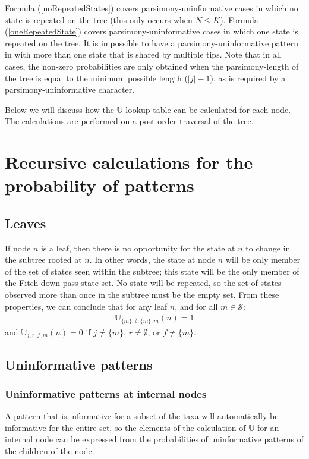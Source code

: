 \documentclass[11pt]{article}
\newcommand{\numStates}{\ensuremath{K}\xspace}
\newcommand{\numLeavesTotal}{\ensuremath{N}\xspace}
\newcommand{\allStates}{\ensuremath{\mathcal S}\xspace}
\newcommand{\probUninformPatClassSym}{\ensuremath{\mathbb U}\xspace}
\newcommand{\probUninformPatClass}[5]{\ensuremath{\probUninformPatClassSym_{#1,#2,#3,#4}\left(#5\right)}\xspace}
\begin{document}
Formula (\ref{noRepeatedStates}) covers parsimony-uninformative cases in which no state is repeated on the tree (this only occurs when $\numLeavesTotal\leq\numStates$).
Formula (\ref{oneRepeatedState}) covers parsimony-uninformative cases in which one state is repeated on the tree.
It is impossible to have a parsimony-uninformative pattern in with more than one state that is shared by multiple tips.
Note that in all cases, the non-zero probabilities are only obtained when the parsimony-length of the tree is equal to the minimum possible length ($|j| - 1$), as is required by a parsimony-uninformative character.

Below we will discuss how the $\probUninformPatClassSym$ lookup table can be calculated for each node.
The calculations are performed on a post-order traversal of the tree.

\section{Recursive calculations for the probability of patterns}
\subsection{Leaves}
If node $n$ is a leaf, then there is no opportunity for the state at $n$ to change in the subtree rooted at $n$.
In other words, the state at node $n$ will be only member of the set of states seen within the subtree; this state will be the only member of the Fitch down-pass state set.
No state will be repeated, so the set of states observed more than once in the subtree must be the empty set.
From these properties, we can conclude that for any leaf $n$, and for all $m \in \allStates$:
\begin{eqnarray}
	\probUninformPatClass{\{m\}}{\emptyset}{\{m\}}{m}{n} = 1 
\end{eqnarray}
and $\probUninformPatClass{j}{r}{f}{m}{n} = 0$ if $j\neq\{m\}$, $r\neq\emptyset$, or $f\neq\{m\}$.


\subsection{Uninformative patterns}
\subsubsection{Uninformative patterns at internal nodes}
A pattern that is informative for a subset of the taxa will automatically be informative for the entire set, so the elements of the calculation of $\probUninformPatClassSym$ for an internal node can be expressed from the probabilities of uninformative patterns of the children of the node.
\end{document}

